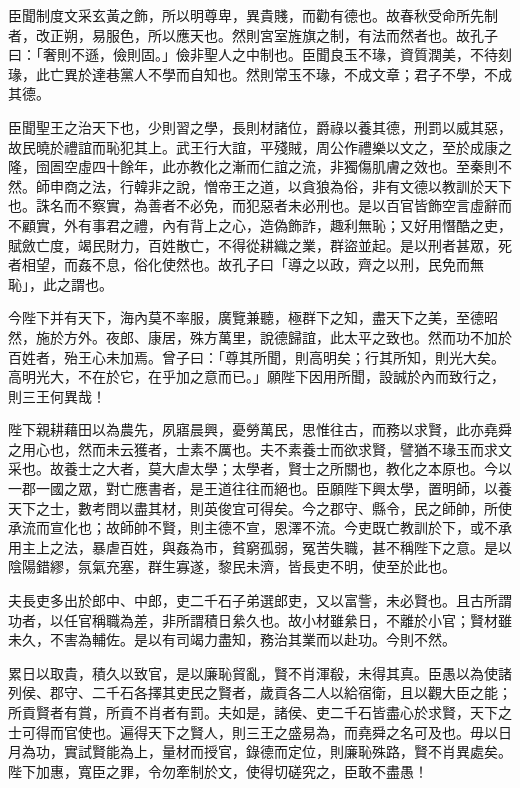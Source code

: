 \begin{pinyinscope}
臣聞制度文采玄黃之飾，所以明尊卑，異貴賤，而勸有德也。故春秋受命所先制者，改正朔，易服色，所以應天也。然則宮室旌旗之制，有法而然者也。故孔子曰：「奢則不遜，儉則固。」儉非聖人之中制也。臣聞良玉不瑑，資質潤美，不待刻瑑，此亡異於達巷黨人不學而自知也。然則常玉不瑑，不成文章；君子不學，不成其德。

臣聞聖王之治天下也，少則習之學，長則材諸位，爵祿以養其德，刑罰以威其惡，故民曉於禮誼而恥犯其上。武王行大誼，平殘賊，周公作禮樂以文之，至於成康之隆，囹圄空虛四十餘年，此亦教化之漸而仁誼之流，非獨傷肌膚之效也。至秦則不然。師申商之法，行韓非之說，憎帝王之道，以貪狼為俗，非有文德以教訓於天下也。誅名而不察實，為善者不必免，而犯惡者未必刑也。是以百官皆飾空言虛辭而不顧實，外有事君之禮，內有背上之心，造偽飾詐，趣利無恥；又好用憯酷之吏，賦斂亡度，竭民財力，百姓散亡，不得從耕織之業，群盜並起。是以刑者甚眾，死者相望，而姦不息，俗化使然也。故孔子曰「導之以政，齊之以刑，民免而無恥」，此之謂也。

今陛下并有天下，海內莫不率服，廣覽兼聽，極群下之知，盡天下之美，至德昭然，施於方外。夜郎、康居，殊方萬里，說德歸誼，此太平之致也。然而功不加於百姓者，殆王心未加焉。曾子曰：「尊其所聞，則高明矣；行其所知，則光大矣。高明光大，不在於它，在乎加之意而已。」願陛下因用所聞，設誠於內而致行之，則三王何異哉！

陛下親耕藉田以為農先，夙寤晨興，憂勞萬民，思惟往古，而務以求賢，此亦堯舜之用心也，然而未云獲者，士素不厲也。夫不素養士而欲求賢，譬猶不瑑玉而求文采也。故養士之大者，莫大虐太學；太學者，賢士之所關也，教化之本原也。今以一郡一國之眾，對亡應書者，是王道往往而絕也。臣願陛下興太學，置明師，以養天下之士，數考問以盡其材，則英俊宜可得矣。今之郡守、縣令，民之師帥，所使承流而宣化也；故師帥不賢，則主德不宣，恩澤不流。今吏既亡教訓於下，或不承用主上之法，暴虐百姓，與姦為市，貧窮孤弱，冤苦失職，甚不稱陛下之意。是以陰陽錯繆，氛氣充塞，群生寡遂，黎民未濟，皆長吏不明，使至於此也。

夫長吏多出於郎中、中郎，吏二千石子弟選郎吏，又以富訾，未必賢也。且古所謂功者，以任官稱職為差，非所謂積日絫久也。故小材雖絫日，不離於小官；賢材雖未久，不害為輔佐。是以有司竭力盡知，務治其業而以赴功。今則不然。

累日以取貴，積久以致官，是以廉恥貿亂，賢不肖渾殽，未得其真。臣愚以為使諸列侯、郡守、二千石各擇其吏民之賢者，歲貢各二人以給宿衛，且以觀大臣之能；所貢賢者有賞，所貢不肖者有罰。夫如是，諸侯、吏二千石皆盡心於求賢，天下之士可得而官使也。遍得天下之賢人，則三王之盛易為，而堯舜之名可及也。毋以日月為功，實試賢能為上，量材而授官，錄德而定位，則廉恥殊路，賢不肖異處矣。陛下加惠，寬臣之罪，令勿牽制於文，使得切磋究之，臣敢不盡愚！


\end{pinyinscope}
